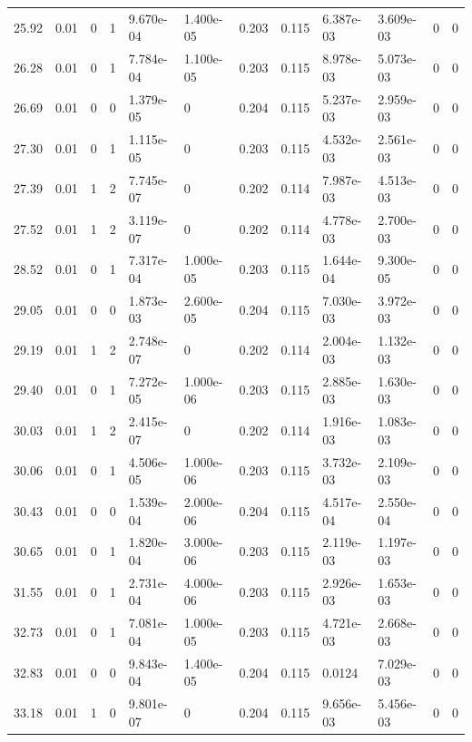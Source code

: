 \documentclass[preview]{standalone}
\begin{document}
{{{\begin{tabular}{L{1.2cm}C{1.2cm} C{0.3cm}C{0.5cm} C{1.4cm}C{1.4cm} C{1.4cm}C{1.4cm} C{1.6cm}C{1.6cm} C{1.6cm}C{1.6cm}}
  25.92  &  0.01  & 0     &  1 &  9.670e-04  & 1.400e-05  &  0.203&   0.115& 6.387e-03 & 3.609e-03   &  0 & 0  \\ 
  26.28  &  0.01  & 0     &  1 &  7.784e-04  & 1.100e-05  &  0.203&   0.115& 8.978e-03 & 5.073e-03   &  0 & 0  \\ 
  26.69  &  0.01  & 0     &  0 &  1.379e-05  & 0  &  0.204&   0.115& 5.237e-03 & 2.959e-03   &  0 & 0  \\ 
  27.30  &  0.01  & 0     &  1 &  1.115e-05  & 0  &  0.203&   0.115& 4.532e-03 & 2.561e-03   &  0 & 0  \\ 
  27.39  &  0.01  & 1     &  2 &  7.745e-07  & 0  &  0.202&   0.114& 7.987e-03 & 4.513e-03   &  0 & 0  \\ 
  27.52  &  0.01  & 1     &  2 &  3.119e-07  & 0  &  0.202&   0.114& 4.778e-03 & 2.700e-03   &  0 & 0  \\ 
  28.52  &  0.01  & 0     &  1 &  7.317e-04  & 1.000e-05  &  0.203&   0.115& 1.644e-04 & 9.300e-05   &  0 & 0  \\ 
  29.05  &  0.01  & 0     &  0 &  1.873e-03  & 2.600e-05  &  0.204&   0.115& 7.030e-03 & 3.972e-03   &  0 & 0  \\ 
  29.19  &  0.01  & 1     &  2 &  2.748e-07  & 0  &  0.202&   0.114& 2.004e-03 & 1.132e-03   &  0 & 0  \\ 
  29.40  &  0.01  & 0     &  1 &  7.272e-05  & 1.000e-06  &  0.203&   0.115& 2.885e-03 & 1.630e-03   &  0 & 0  \\ 
  30.03  &  0.01  & 1     &  2 &  2.415e-07  & 0  &  0.202&   0.114& 1.916e-03 & 1.083e-03   &  0 & 0  \\ 
  30.06  &  0.01  & 0     &  1 &  4.506e-05  & 1.000e-06  &  0.203&   0.115& 3.732e-03 & 2.109e-03   &  0 & 0  \\ 
  30.43  &  0.01  & 0     &  0 &  1.539e-04  & 2.000e-06  &  0.204&   0.115& 4.517e-04 & 2.550e-04   &  0 & 0  \\ 
  30.65  &  0.01  & 0     &  1 &  1.820e-04  & 3.000e-06  &  0.203&   0.115& 2.119e-03 & 1.197e-03   &  0 & 0  \\ 
  31.55  &  0.01  & 0     &  1 &  2.731e-04  & 4.000e-06  &  0.203&   0.115& 2.926e-03 & 1.653e-03   &  0 & 0  \\ 
  32.73  &  0.01  & 0     &  1 &  7.081e-04  & 1.000e-05  &  0.203&   0.115& 4.721e-03 & 2.668e-03   &  0 & 0  \\ 
  32.83  &  0.01  & 0     &  0 &  9.843e-04  & 1.400e-05  &  0.204&   0.115& 0.0124 & 7.029e-03   &  0 & 0  \\ 
  33.18  &  0.01  & 1     &  0 &  9.801e-07  & 0  &  0.204&   0.115& 9.656e-03 & 5.456e-03   &  0 & 0  \\ 

\end{tabular}}}}
\end{document}
